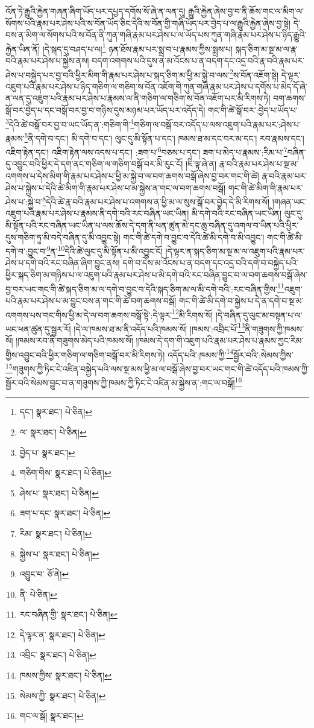 འོན་ཏེ་རྒྱུའི་རྐྱེན་གཞན་ཞིག་ཡོད་པར་དཔྱད་དགོས་སོ་ཞེ་ན་ལན་དུ། རྒྱུའི་རྐྱེན་ཞེས་བྱ་བ་ནི་ཆོས་གང་ལ་མིག་ལ་སོགས་པའི་རྣམ་པར་ཤེས་པའི་ས་བོན་ཡོད་ཅིང་དེའི་ས་བོན་གྱི་གཞི་ཡོད་པར་བྱེད་པ་ལ་རྒྱུའི་རྐྱེན་ཞེས་བྱ་སྟེ། དེ་བས་ན་མིག་ལ་སོགས་པའི་ས་བོན་ནི་ཀུན་གཞི་རྣམ་པར་ཤེས་པ་ལ་ཡོད་པས་ཀུན་གཞི་རྣམ་པར་ཤེས་པ་ཉིད་རྒྱུའི་རྐྱེན་ཡིན་ནོ། །དེ་སྐད་དུ་བཤད་པ་ལ།\footnote{དང་།  སྣར་ཐང་།  པེ་ཅིན། } ཉན་ཐོས་རྣམ་པར་སྨྲ་བ་པ་རྣམས་ཀྱིས་སྨྲས་པ། སྐད་ཅིག་མ་སྔ་མ་ལ་རྣ་བའི་རྣམ་པར་ཤེས་པ་སྐྱེས་ནས། བདག་འགགས་པའི་དུས་ན་མ་འོངས་པ་ན་བདག་དང་འདྲ་བའི་རྣ་བའི་རྣམ་པར་ཤེས་པ་བསྐྱེད་པར་བྱ་བའི་ཕྱིར་མིག་གི་རྣམ་པར་ཤེས་པ་སྐད་ཅིག་མ་ཕྱི་མ་སྐྱེ་བ་ལས་\footnote{ལ་  སྣར་ཐང་།  པེ་ཅིན། }ས་བོན་འཇོག་སྟེ། དེ་ལྟར་འཇུག་པའི་རྣམ་པར་ཤེས་པ་ཉིད་གཅིག་ལ་གཅིག་ས་བོན་འཇོག་གི་ཀུན་གཞི་རྣམ་པར་ཤེས་པ་དགོས་པ་མེད་དོ་ཞེ་ན་ལན་དུ་འཇུག་པའི་རྣམ་པར་ཤེས་པ་རྣམས་ལ་ནི་གཅིག་ལ་གཅིག་ས་བོན་འཇོག་པར་མི་རིགས་ཏེ། བག་ཆགས་སྒོ་བར་བྱེད་པ་དང་བསྒོ་བར་བྱ་བ་གཉིས་དུས་མཉམ་པར་ཡོད་པར་འདོད་དེ། གང་གི་ཚེ་སྒོ་བར་:བྱེད་པ་ཡོད་པ་\footnote{བྱེད་པ་  སྣར་ཐང་། }དེའི་ཚེ་བསྒོ་བར་བྱ་བ་ཡང་ཡོད་ན་:གཅིག་གི་\footnote{གཅིག་གིས་  སྣར་ཐང་།  པེ་ཅིན། }གཅིག་ལ་བསྒོ་བར་འདོད་པ་ལས་འཇུག་པའི་རྣམ་པར་:ཤེས་པ་རྣམས་\footnote{ཤེས་པ་  སྣར་ཐང་།  པེ་ཅིན། }ནི་དགེ་བ་དང་། མི་དགེ་བ་དང་། ལུང་དུ་མི་སྟོན་པ་དང་། ཁམས་ཐ་མ་དང་བར་མ་དང་། རབ་རྣམས་དང་། འཇིག་རྟེན་དང་། འཇིག་རྟེན་ལས་འདས་པ་དང་། :ཟག་པ་\footnote{ཟག་པ་དང་  སྣར་ཐང་།  པེ་ཅིན། }བཅས་པ་དང་། ཟག་པ་མེད་པ་རྣམས་:རིམ་པ་\footnote{རིམ་  སྣར་ཐང་།  པེ་ཅིན། }བཞིན་དུ་འབྱུང་བའི་ཕྱིར་དེ་དག་ནང་གཅིག་ལ་གཅིག་བསྒོ་བར་མི་རུང་ངོ། །ཇི་ལྟ་ཞེ་ན། རྣ་བའི་རྣམ་པར་ཤེས་པ་སྔ་མ་འགགས་པ་དེས་མིག་གི་རྣམ་པར་ཤེས་པ་ཕྱི་མ་སྐྱེ་བ་ལ་བག་ཆགས་བསྒོ་ཞེས་བྱ་བར་གང་གི་ཚེ། རྣ་བའི་རྣམ་པར་ཤེས་པ་སྐྱེས་པ་དེའི་ཚེ་མིག་གི་རྣམ་པར་ཤེས་པ་མ་སྐྱེས་ན་གང་ལ་བག་ཆགས་བསྒོ། གང་གི་ཚེ་མིག་གི་རྣམ་པར་ཤེས་པ་:སྐྱེ་བ་\footnote{སྐྱེས་པ་  སྣར་ཐང་།  པེ་ཅིན། }དེའི་ཚེ་རྣ་བའི་རྣམ་པར་ཤེས་པ་འགགས་ན་ཕྱི་མ་ལ་སུས་སྒོ་བར་བྱེད་དེ་མི་རིགས་སོ། །གཞན་ཡང་འཇུག་པའི་རྣམ་པར་ཤེས་པ་རྣམས་ནི་དགེ་བའི་རང་བཞིན་ཡང་ཡིན། མི་དགེ་བའི་རང་བཞིན་ཡང་ཡིན། ལུང་དུ་མི་སྟོན་པའི་རང་བཞིན་ཡང་ཡིན་པ་ལས་ཆོས་དེ་དག་ནི་ཕན་ཚུན་མེ་དང་ཆུ་བཞིན་དུ་འགལ་བ་ཡིན་པའི་ཕྱིར་དུས་གཅིག་ཏུ་མི་བདེ་བཞིན་དུ་མི་འབྱུང་སྟེ། གང་གི་ཚེ་དགེ་བ་བྱུང་བ་དེའི་ཚེ་མི་དགེ་བ་མི་འབྱུང་། གང་གི་ཚེ་མི་དགེ་བ་:བྱུང་བ་\footnote{འབྱུང་བ་  ཅོ་ནེ། }ན་\footnote{ནི་  པེ་ཅིན། }དེའི་ཚེ་ལུང་དུ་མི་སྟོན་པ་མི་འབྱུང་ངོ། །དེ་ལྟར་ན་སྐད་ཅིག་མ་སྔ་མ་ལ་འཇུག་པའི་རྣམ་པར་ཤེས་པ་དགེ་བའི་རང་བཞིན་ཞིག་བྱུང་ནས། དགེ་བ་དེས་མ་འོངས་པ་ན་བདག་དང་འདྲ་བའི་དགེ་བ་བསྐྱེད་པའི་ཕྱིར་སྐད་ཅིག་མ་གཉིས་པ་ལ་འཇུག་པའི་རྣམ་པར་ཤེས་པ་མི་དགེ་བའི་རང་བཞིན་བྱུང་བ་ལ་བག་ཆགས་བསྒོ་ཞེས་བྱ་བར་ཡང་གང་གི་ཚེ་སྐད་ཅིག་མ་ལ་དགེ་བ་བྱུང་བ་དེའི་སྐད་ཅིག་མ་ལ་མི་དགེ་བའི་:རང་བཞིན་གྱིས་\footnote{རང་བཞིན་གྱི་  སྣར་ཐང་།  པེ་ཅིན། }འཇུག་པའི་རྣམ་པར་ཤེས་པ་མ་བྱུང་བས་ན་གང་གི་ཚེ་བག་ཆགས་བསྒོ། གང་གི་ཚེ་མི་དགེ་བ་སྐྱེས་པ་དེ་ན་དགེ་བ་སྔ་མ་འགགས་པས་གང་གིས་ཕྱི་མ་དེ་ལ་བག་ཆགས་བསྒོ་སྟེ་:དེ་ལྟར་\footnote{དེ་ལྟར་ན་  སྣར་ཐང་།  པེ་ཅིན། }མི་རིགས་སོ། །དེ་བཞིན་དུ་ལུང་མ་བསྟན་པ་ལ་ཡང་ཕན་ཚུན་དུ་སྦྱར་རོ། །དེ་ལ་ཁམས་ཐ་མ་ནི་འདོད་པའི་ཁམས་སོ། །ཁམས་:འབྲིང་པོ་\footnote{འབྲིང་  སྣར་ཐང་།  པེ་ཅིན། }ནི་གཟུགས་ཀྱི་ཁམས་སོ། །ཁམས་རབ་ནི་གཟུགས་མེད་པའི་ཁམས་སོ། །ཁམས་དེ་དག་གི་འཇུག་པའི་རྣམ་པར་ཤེས་པ་རྣམས་ཀྱང་རིམ་གྱིས་འབྱུང་བའི་ཕྱིར་གཅིག་ལ་གཅིག་བསྒོ་བར་མི་རིགས་ཏེ། འདོད་པའི་:ཁམས་ཀྱི་\footnote{ཁམས་ཀྱིས་  སྣར་ཐང་།  པེ་ཅིན། }སྦྱོར་བའི་:སེམས་ཀྱིས་\footnote{སེམས་ཀྱི་  སྣར་ཐང་།  པེ་ཅིན། }གཟུགས་ཀྱི་ཏིང་ངེ་འཛིན་བསྐྱེད་པའི་ལས་སྔ་མས་ཕྱི་མ་ལ་བསྒོ་ཞེས་བྱ་བར་ཡང་གང་གི་ཚེ་འདོད་པའི་ཁམས་ཀྱི་སྦྱོར་བའི་སེམས་བྱུང་བ་ན་གཟུགས་ཀྱི་ཁམས་ཀྱི་ཏིང་ངེ་འཛིན་མ་སྐྱེས་ན་:གང་ལ་བསྒོ།\footnote{གང་ལ་སྒོ།  སྣར་ཐང་། } 